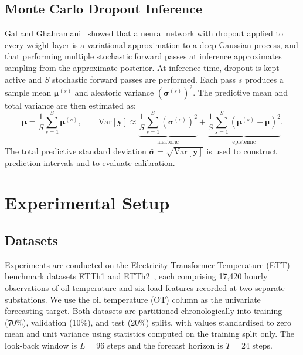 \documentclass[runningheads]{llncs}
\begin{document}
\subsection{Monte Carlo Dropout Inference}

Gal and Ghahramani~\cite{gal2016} showed that a neural network with dropout applied
to every weight layer is a variational approximation to a deep Gaussian process,
and that performing multiple stochastic forward passes at inference approximates
sampling from the approximate posterior.
At inference time, dropout is kept active and $S$ stochastic forward passes are
performed.
Each pass $s$ produces a sample mean $\boldsymbol{\mu}^{(s)}$ and aleatoric
variance $(\boldsymbol{\sigma}^{(s)})^2$.
The predictive mean and total variance are then estimated as:
\begin{equation}
  \bar{\boldsymbol{\mu}} = \frac{1}{S}\sum_{s=1}^{S}\boldsymbol{\mu}^{(s)},
  \qquad
  \mathrm{Var}[\mathbf{y}] \approx
  \underbrace{\frac{1}{S}\sum_{s=1}^{S}(\boldsymbol{\sigma}^{(s)})^2}_{\text{aleatoric}}
  +
  \underbrace{\frac{1}{S}\sum_{s=1}^{S}
    \!\left(\boldsymbol{\mu}^{(s)} - \bar{\boldsymbol{\mu}}\right)^{\!2}}_{\text{epistemic}}.
  \label{eq:mc}
\end{equation}
The total predictive standard deviation
$\bar{\boldsymbol{\sigma}} = \sqrt{\mathrm{Var}[\mathbf{y}]}$
is used to construct prediction intervals and to evaluate calibration.

\section{Experimental Setup}

\subsection{Datasets}

Experiments are conducted on the Electricity Transformer Temperature (ETT) benchmark
datasets ETTh1 and ETTh2~\cite{zhou2021informer}, each comprising 17,420 hourly
observations of oil temperature and six load features recorded at two separate
substations.
We use the oil temperature (OT) column as the univariate forecasting target.
Both datasets are partitioned chronologically into training (70\%), validation (10\%),
and test (20\%) splits, with values standardised to zero mean and unit variance
using statistics computed on the training split only.
The look-back window is $L = 96$ steps and the forecast horizon is $T = 24$ steps.
\end{document}
